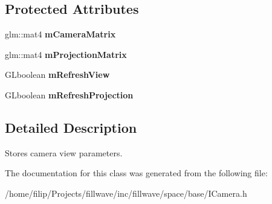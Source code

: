 \subsection*{Protected Attributes}
\begin{DoxyCompactItemize}
\item 
glm\+::mat4 {\bfseries m\+Camera\+Matrix}\hypertarget{classflw_1_1flf_1_1ICamera_a96135bcf2aa431c21ff72586e6857cde}{}\label{classflw_1_1flf_1_1ICamera_a96135bcf2aa431c21ff72586e6857cde}

\item 
glm\+::mat4 {\bfseries m\+Projection\+Matrix}\hypertarget{classflw_1_1flf_1_1ICamera_aa42f67c78d9102d1a0145c5d115e962a}{}\label{classflw_1_1flf_1_1ICamera_aa42f67c78d9102d1a0145c5d115e962a}

\item 
G\+Lboolean {\bfseries m\+Refresh\+View}\hypertarget{classflw_1_1flf_1_1ICamera_a53df3590abc5d8e52fc7d88cf42a3c61}{}\label{classflw_1_1flf_1_1ICamera_a53df3590abc5d8e52fc7d88cf42a3c61}

\item 
G\+Lboolean {\bfseries m\+Refresh\+Projection}\hypertarget{classflw_1_1flf_1_1ICamera_a6553d3e78499407b28e40a149a4fc3e8}{}\label{classflw_1_1flf_1_1ICamera_a6553d3e78499407b28e40a149a4fc3e8}

\end{DoxyCompactItemize}


\subsection{Detailed Description}
Stores camera view parameters. 

The documentation for this class was generated from the following file\+:\begin{DoxyCompactItemize}
\item 
/home/filip/\+Projects/fillwave/inc/fillwave/space/base/I\+Camera.\+h\end{DoxyCompactItemize}
